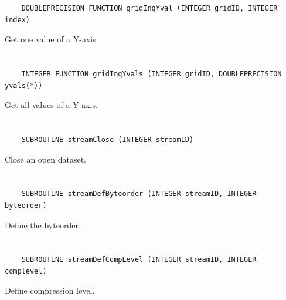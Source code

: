 \begin{verbatim}
    DOUBLEPRECISION FUNCTION gridInqYval (INTEGER gridID, INTEGER index)
\end{verbatim}

Get one value of a Y-axis.


\section*{\tt {}}

\begin{verbatim}
    INTEGER FUNCTION gridInqYvals (INTEGER gridID, DOUBLEPRECISION yvals(*))
\end{verbatim}

Get all values of a Y-axis.


\section*{\tt {}}

\begin{verbatim}
    SUBROUTINE streamClose (INTEGER streamID)
\end{verbatim}

Close an open dataset.


\section*{\tt {}}

\begin{verbatim}
    SUBROUTINE streamDefByteorder (INTEGER streamID, INTEGER byteorder)
\end{verbatim}

Define the byteorder.


\section*{\tt {}}

\begin{verbatim}
    SUBROUTINE streamDefCompLevel (INTEGER streamID, INTEGER complevel)
\end{verbatim}

Define compression level.


\section*{\tt {}}

